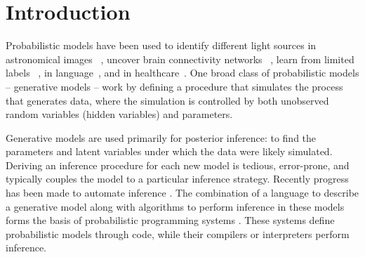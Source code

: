 \section{Introduction}
Probabilistic models have been used to identify different light sources in astronomical images
~\citep{regier2015celeste}, uncover brain connectivity networks ~\citep{manning2014topographic}, learn
from limited labels ~\citep{lake2015human, kingma2014semi}, in language~\citep{blei2003latent},
and in healthcare~\citep{ranganath2016deep}. 
One broad class of probabilistic models -- generative models --
work by defining a procedure that simulates the process that generates data, where the simulation is controlled by both unobserved random variables (hidden variables) and parameters.


Generative models are used primarily for posterior inference: to find the parameters and latent variables under which the data were likely simulated.
Deriving an inference procedure for each new model is tedious, error-prone, and typically couples the model to a particular inference strategy.
Recently progress has been made to automate inference \citep{hoffman2014no, ranganath2014black}. The combination of a language to describe a generative model along with algorithms to perform inference in these models forms the basis of probabilistic programming systems 
\citep{goodman2008church,wood2014new,mansinghka2014venture,carpenter2017stan}.
These systems define probabilistic models through code, while their compilers or interpreters perform inference.


